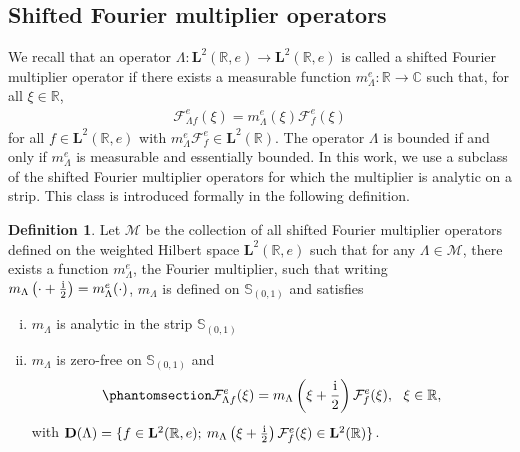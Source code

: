 \documentclass[12pt]{amsart}
\newcommand{\hlabel}{\phantomsection\label}
\newcommand{\hptg}[2]{\hypertarget{#1}{#2}}
\numberwithin{equation}{section}
\newcommand{\bb}{\mathbb}
\newcommand{\cc}{\mathcal}
\newcommand{\hpt}[2]{#2}
\newcommand{\tred}{}
\newcommand{\tredd}{\textcolor{red}}
\newcommand{\bmrm}[2][2]{\mathbf{#2}^{#1}}
\newcommand{\fouho}{\cc{F}^{e}}
\newcommand{\D}{\mathbf{D}}
\newcommand{\LL}{\Lambda}
\newcommand{\LRe}{\bmrm{L}(\bb{R},e)}
\renewcommand{\tredd}{}
\theoremstyle{definition}
\newtheorem{definition}[thm]{Definition}
\theoremstyle{assump}
\theoremstyle{remark}
\begin{document}
\subsection{Shifted Fourier multiplier operators}\hlabel{ss:fourier_mult}%
We recall that an operator $\Lambda:\LRe\to\LRe$ is called a shifted Fourier multiplier operator if there exists a measurable function $m^e_\LL:\bb{R}\to\bb{C}$ such that, for all $\xi\in\bb{R}$,
\begin{align*}
	\fouho_{\Lambda f}(\xi)=m^e_\LL(\xi)\fouho_f(\xi)
\end{align*}
for all $f\in\LRe$ with $m^e_\LL\fouho_{\!f}\in\bmrm{L}(\bb{R})$. The operator $\Lambda$ is bounded if and only if $\tredd{m^e_{\Lambda}}$ is measurable and essentially bounded. In this work, we use a subclass of the shifted Fourier multiplier operators for which the multiplier is analytic on a strip. This class is introduced formally in the following definition.
\begin{definition}
Let $\mathscr{M}$ be the collection of all shifted Fourier multiplier operators defined on the weighted Hilbert space $\bmrm{L}(\bb{R},e)$ such that
for any $\LL\in\mathscr{M}$, there exists a function $m^e_{\LL}$, the Fourier multiplier, such that  writing \hpt{R10}{$m_{\LL}\left(\cdot+\frac{{\rm{i}}}{2}\right)=m^e_{\LL}(\cdot)$}, $m_{\LL}$ is defined on $\bb{S}_{(0,1)}$  and satisfies
\begin{enumerate}[(i)]
\item $m_{\LL}$ is analytic in the strip $\bb{S}_{(0,1)}$
\item $m_\LL$ is \hptg{C23}{zero-free} on $\bb{S}_{(0,1)}$
and
\begin{align}\hlabel{fourier_mult}
\fouho_{\LL f}(\xi)=m_{\LL}\left(\xi+\frac{{\rm{i}}}{2}\right)\fouho_f(\xi), \ \ \xi\in\bb{R},
\end{align}
with $\D(\LL)=\{f\in \bmrm{L}(\bb{R},e); \: m_{\LL}\left(\xi+\frac{{\rm{i}}}{2}\right)\fouho_{f}(\xi)\in \bmrm{L}(\bb{R})\}$.
\end{enumerate}
\end{definition}
\end{document}
